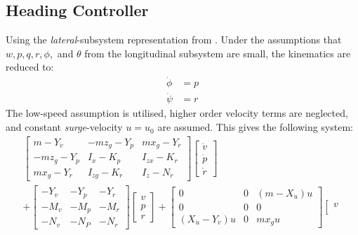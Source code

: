 	\subsection{Heading Controller}
		Using the \textit{lateral}-subsystem representation from \cite{fossen}. Under the assumptions
		that $w, p, q, r, \phi,$ and $\theta$ from the longitudinal subsystem are small, the
		kinematics are reduced to:
		\begin{align}
			\dot{\phi} &= p \\
			\dot{\psi} &= r 
		\end{align}
		The low-speed assumption is utilised, higher order velocity terms are neglected, and
		constant \textit{surge}-velocity $u = u_0$ are assumed. This gives the following system:
		\begin{equation}
			\begin{aligned}
				\left [ \begin{array}{ccc}
					m - Y_{\dot{v}} & - m z_g - Y_{\dot{p}} & m x_g - Y_{\dot{r}} \\
					-m z_g - Y_{\dot{p}} & I_x - K_{\dot{p}} & I_{zx} - K_{\dot{r}} \\
					m x_g - Y_{\dot{r}} & I_{zg} - K_{\dot{r}} & I_z - N_{\dot{r}} 
					\end{array} \right]
				\left [ \begin{array}{c}
					\dot{v} \\
					\dot{p} \\
					\dot{r} 
					\end{array} \right] \\
				+ \left [ \begin{array}{ccc}
					-Y_v	&	-Y_p 	&	-Y_r \\
					-M_v	&	-M_p	&	-M_r \\
					-N_v	&	-N_P	&	-N_r
					\end{array} \right]
				\left [ \begin{array}{c}
					v \\
					p \\
					r 
				\end{array} \right] + 
				\left [ \begin{array}{ccc} 
					0 & 0 & (m - X_{\dot{u}})u \\
					0 & 0 &  0 \\
					(X_{\dot{u}} - Y_{\dot{v}}) u & 0 & m x_g u 
					\end{array} \right]	
				\left [ \begin{array}{c}
					v \\

\end{array}
\end{aligned}
\end{equation}
